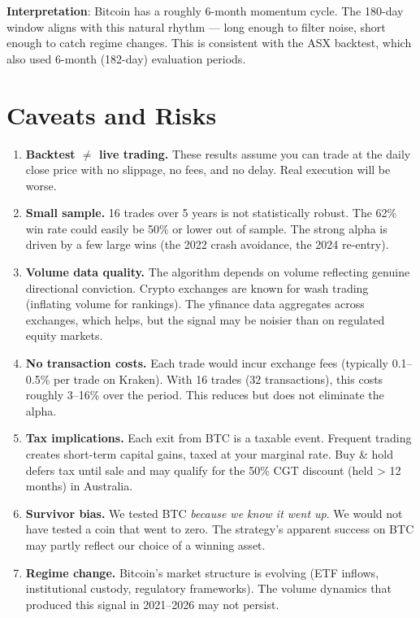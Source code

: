 \documentclass[11pt,a4paper]{article}
\begin{document}
\textbf{Interpretation}: Bitcoin has a roughly 6-month momentum cycle.
The 180-day window aligns with this natural rhythm --- long enough to
filter noise, short enough to catch regime changes. This is consistent
with the ASX backtest, which also used 6-month (182-day) evaluation
periods.


\section{Caveats and Risks}

\begin{enumerate}[leftmargin=2em]
    \item \textbf{Backtest $\neq$ live trading.} These results assume
          you can trade at the daily close price with no slippage,
          no fees, and no delay. Real execution will be worse.

    \item \textbf{Small sample.} 16 trades over 5 years is not
          statistically robust. The 62\% win rate could easily be
          50\% or lower out of sample. The strong alpha is driven
          by a few large wins (the 2022 crash avoidance, the 2024
          re-entry).

    \item \textbf{Volume data quality.} The algorithm depends on
          volume reflecting genuine directional conviction. Crypto
          exchanges are known for wash trading (inflating volume
          for rankings). The yfinance data aggregates across
          exchanges, which helps, but the signal may be noisier
          than on regulated equity markets.

    \item \textbf{No transaction costs.} Each trade would incur
          exchange fees (typically 0.1--0.5\% per trade on Kraken).
          With 16 trades (32 transactions), this costs roughly
          3--16\% over the period. This reduces but does not
          eliminate the alpha.

    \item \textbf{Tax implications.} Each exit from BTC is a
          taxable event. Frequent trading creates short-term
          capital gains, taxed at your marginal rate. Buy \& hold
          defers tax until sale and may qualify for the 50\% CGT
          discount (held > 12 months) in Australia.

    \item \textbf{Survivor bias.} We tested BTC \emph{because we
          know it went up}. We would not have tested a coin that
          went to zero. The strategy's apparent success on BTC may
          partly reflect our choice of a winning asset.

    \item \textbf{Regime change.} Bitcoin's market structure is
          evolving (ETF inflows, institutional custody, regulatory
          frameworks). The volume dynamics that produced this signal
          in 2021--2026 may not persist.
\end{enumerate}
\end{document}
